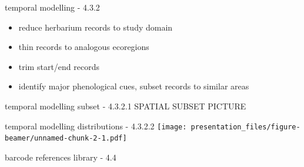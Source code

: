 \documentclass[
  ignorenonframetext,
]{beamer}
\providecommand{\tightlist}{%
  \setlength{\itemsep}{0pt}\setlength{\parskip}{0pt}}
\begin{document}
\begin{frame}{temporal modelling - 4.3.2}
\protect\hypertarget{temporal-modelling---4.3.2}{}
\begin{itemize}
\tightlist
\item
  reduce herbarium records to study domain
\item
  thin records to analogous ecoregions
\item
  trim start/end records
\item
  identify major phenological cues, subset records to similar areas
\end{itemize}
\end{frame}

\begin{frame}{temporal modelling subset - 4.3.2.1}
\protect\hypertarget{temporal-modelling-subset---4.3.2.1}{}
SPATIAL SUBSET PICTURE
\end{frame}

\begin{frame}{temporal modelling distributions - 4.3.2.2}
\protect\hypertarget{temporal-modelling-distributions---4.3.2.2}{}
\texttt{[image: presentation\_files/figure-beamer/unnamed-chunk-2-1.pdf]}
\end{frame}

\begin{frame}{barcode references library - 4.4}
\protect\hypertarget{barcode-references-library---4.4}{}
\end{frame}
\end{document}
